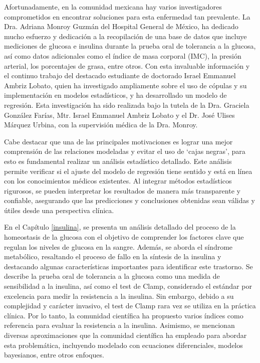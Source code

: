 Afortunadamente, en la comunidad mexicana hay varios investigadores comprometidos en encontrar soluciones para esta enfermedad tan prevalente. La Dra. Adriana Monroy Guzmán del Hospital General de México, ha dedicado mucho esfuerzo y dedicación a la recopilación de una base de datos que incluye mediciones de glucosa e insulina durante la prueba oral de tolerancia a la glucosa, así como datos adicionales como el índice de masa corporal (IMC), la presión arterial, los porcentajes de grasa, entre otros. Con esta invaluable información y el continuo trabajo del destacado estudiante de doctorado Israel Emmanuel Ambriz Lobato, quien ha investigado ampliamente sobre el uso de cópulas y su implementación en modelos estadísticos, y ha desarrollado un modelo de regresión. Esta investigación ha sido realizada bajo la tutela de la Dra. Graciela González Farías, Mtr. Israel Emmanuel Ambriz Lobato y el Dr. José Ulises Márquez Urbina, con la supervisión médica de la Dra. Monroy.

Cabe destacar que una de las principales motivaciones es lograr una mejor comprensión de las relaciones modeladas y evitar el uso de `cajas negras', para esto es fundamental realizar un análisis estadístico detallado. Este análisis permite verificar si el ajuste del modelo de regresión tiene sentido y está en línea con los conocimientos médicos existentes. Al integrar métodos estadísticos rigurosos, se pueden interpretar los resultados de manera más transparente y confiable, asegurando que las predicciones y conclusiones obtenidas sean válidas y útiles desde una perspectiva clínica.

En el Capítulo \ref{insulina}, se presenta un análisis detallado del proceso de la homeostasis de la glucosa con el objetivo de comprender los factores clave que regulan los niveles de glucosa en la sangre. Además, se aborda el síndrome metabólico, resaltando el proceso de fallo en la síntesis de la insulina y destacando algunas características importantes para identificar este trastorno. Se describe la prueba oral de tolerancia a la glucosa como una medida de sensibilidad a la insulina, así como el test de Clamp, considerado el estándar por excelencia para medir la resistencia a la insulina. Sin embargo, debido a su complejidad y carácter invasivo, el test de Clamp rara vez se utiliza en la práctica clínica. Por lo tanto, la comunidad científica ha propuesto varios índices como referencia para evaluar la resistencia a la insulina. Asimismo, se mencionan diversas aproximaciones que la comunidad científica ha empleado para abordar esta problemática, incluyendo modelado con ecuaciones diferenciales, modelos bayesianos, entre otros enfoques.

